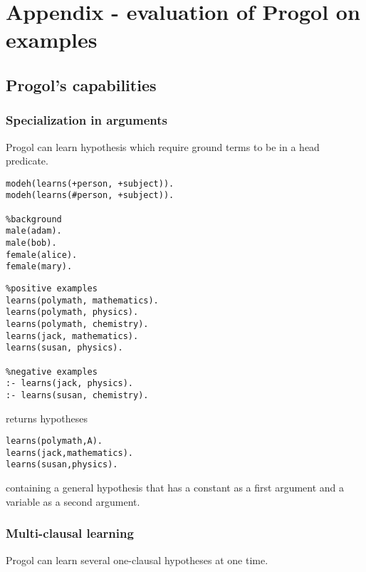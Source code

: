 \chapter{Appendix - evaluation of Progol on examples}

\section{Progol's capabilities}

\subsection{Specialization in arguments}\label{progol_specialization_in_arguments}
Progol can learn hypothesis which require ground terms to be in a head predicate.

\begin{minipage}[t]{.50\textwidth}
\begin{lstlisting}
modeh(learns(+person, +subject)).
modeh(learns(#person, +subject)).

%background
male(adam).
male(bob).
female(alice).
female(mary).
\end{lstlisting}
\end{minipage}
\begin{minipage}[t]{.20\textwidth}
\begin{lstlisting}
%positive examples
learns(polymath, mathematics).
learns(polymath, physics).
learns(polymath, chemistry).
learns(jack, mathematics).
learns(susan, physics).

%negative examples
:- learns(jack, physics).
:- learns(susan, chemistry).
\end{lstlisting}
\end{minipage}

returns hypotheses
\begin{lstlisting}
learns(polymath,A).
learns(jack,mathematics).
learns(susan,physics).
\end{lstlisting}
containing a general hypothesis  that has a constant  as a first argument and a variable as a second argument.

\subsection{Multi-clausal learning}\label{progol_multiclausal_learning}
Progol can learn several one-clausal hypotheses at one time.

